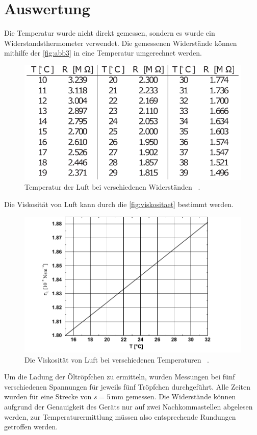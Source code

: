 \section{Auswertung}

Die Temperatur wurde nicht direkt gemessen, sondern es wurde ein Widerstandsthermometer verwendet.
Die gemessenen Widerstände können mithilfe der \autoref{fig:abb3} in eine Temperatur umgerechnet werden.
\begin{figure}[H]
  \centering
  \includegraphics{figures/Temperatur.pdf}
  \caption{Temperatur der Luft bei verschiedenen Widerständen \cite{ap12}\, .} 
  \label{fig:abb3}
\end{figure}
Die Viskosität von Luft kann durch die \autoref{fig:viskositaet} bestimmt werden.
\begin{figure}[H]
  \centering
  \includegraphics{figures/Viskositaet.pdf}
  \caption{Die Viskosität von Luft bei verschiedenen Temperaturen  \cite{ap12}\, .} 
  \label{fig:viskositaet}
\end{figure}


Um die Ladung der Öltröpfchen zu ermitteln, wurden Messungen bei fünf verschiedenen Spannungen für jeweils fünf Tröpfchen durchgeführt.
Alle Zeiten wurden für eine Strecke von $s = 5 \, \unit{\milli\meter}$ gemessen.
Die Widerstände können aufgrund der Genauigkeit des Geräts nur auf zwei Nachkommastellen abgelesen werden, zur Temperaturermittlung
müssen also entsprechende Rundungen getroffen werden. \\

